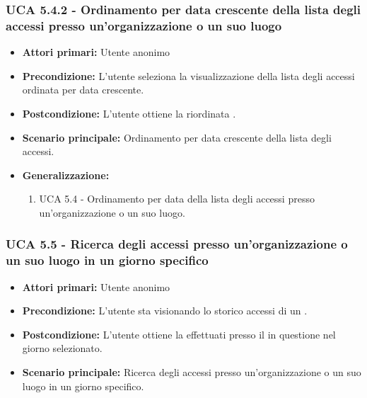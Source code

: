 \subsubsection{UCA 5.4.2 - Ordinamento per data crescente della lista degli accessi presso un'organizzazione o un suo luogo}
\begin{itemize}
    \item \textbf{Attori primari:} Utente anonimo
    \item \textbf{Precondizione:} L'utente seleziona la visualizzazione della lista degli accessi ordinata per data crescente.
    \item \textbf{Postcondizione:} L'utente ottiene la  riordinata .
    \item \textbf{Scenario principale:} Ordinamento per data crescente della lista degli accessi.
    \item \textbf{Generalizzazione:}
	\begin{enumerate}
		\item UCA 5.4 - Ordinamento per data della lista degli accessi presso un'organizzazione o un suo luogo.
	\end{enumerate}
\end{itemize}

\subsubsection{UCA 5.5 - Ricerca degli accessi presso un'organizzazione o un suo luogo in un giorno specifico}
\begin{itemize}
    \item \textbf{Attori primari:} Utente anonimo
    \item \textbf{Precondizione:} L'utente sta visionando lo storico accessi di un .
    \item \textbf{Postcondizione:} L'utente ottiene la  effettuati presso il  in questione nel giorno selezionato.
    \item \textbf{Scenario principale:} Ricerca degli accessi presso un'organizzazione o un suo luogo in un giorno specifico.
\end{itemize}